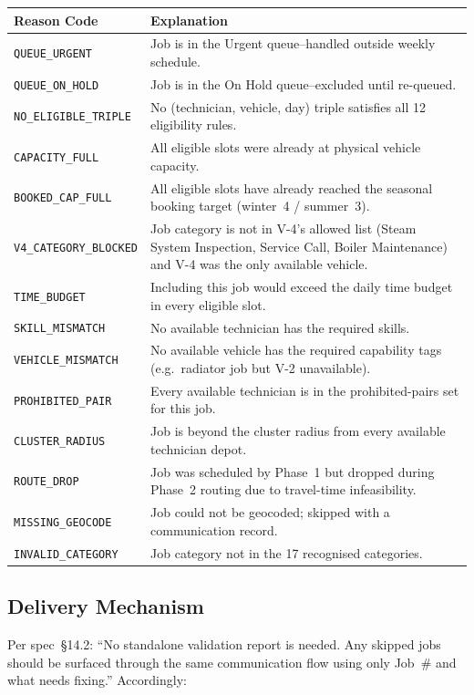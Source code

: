 \documentclass[12pt]{article}
\begin{document}
\medskip
{\small
\begin{longtable}{lp{9cm}}
\toprule
\textbf{Reason Code} & \textbf{Explanation} \\
\midrule
\texttt{QUEUE\_URGENT}       & Job is in the Urgent queue--handled outside weekly schedule. \\
\texttt{QUEUE\_ON\_HOLD}     & Job is in the On Hold queue--excluded until re-queued. \\
\texttt{NO\_ELIGIBLE\_TRIPLE}& No (technician, vehicle, day) triple satisfies all 12 eligibility rules. \\
\texttt{CAPACITY\_FULL}      & All eligible slots were already at physical vehicle capacity. \\
\texttt{BOOKED\_CAP\_FULL}   & All eligible slots have already reached the seasonal booking target (winter~4 / summer~3). \\
\texttt{V4\_CATEGORY\_BLOCKED}& Job category is not in V-4's allowed list (Steam System Inspection, Service Call, Boiler Maintenance) and V-4 was the only available vehicle. \\
\texttt{TIME\_BUDGET}        & Including this job would exceed the daily time budget in every eligible slot. \\
\texttt{SKILL\_MISMATCH}     & No available technician has the required skills. \\
\texttt{VEHICLE\_MISMATCH}   & No available vehicle has the required capability tags (e.g.\ radiator job but V-2 unavailable). \\
\texttt{PROHIBITED\_PAIR}    & Every available technician is in the prohibited-pairs set for this job. \\
\texttt{CLUSTER\_RADIUS}     & Job is beyond the cluster radius from every available technician depot. \\
\texttt{ROUTE\_DROP}         & Job was scheduled by Phase~1 but dropped during Phase~2 routing due to travel-time infeasibility. \\
\texttt{MISSING\_GEOCODE}    & Job could not be geocoded; skipped with a communication record. \\
\texttt{INVALID\_CATEGORY}   & Job category not in the 17 recognised categories. \\
\bottomrule
\end{longtable}
}  
\subsection*{Delivery Mechanism}

Per spec~\S14.2: ``No standalone validation report is needed.  Any skipped jobs should be surfaced through the same communication flow using only Job~\# and what needs fixing.''
Accordingly:
\end{document}

